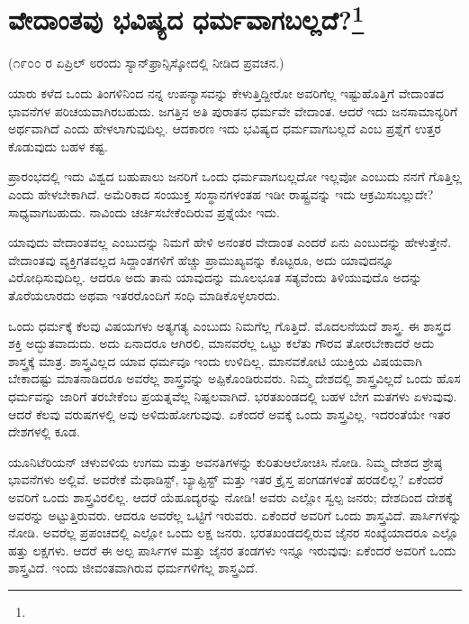 
\chapter[ವೇದಾಂತವು ಭವಿಷ್ಯದ ಧರ್ಮವಾಗಬಲ್ಲದೆ?]{ವೇದಾಂತವು ಭವಿಷ್ಯದ ಧರ್ಮವಾಗಬಲ್ಲದೆ?\protect\footnote{}}

\begin{center}
(೧೯೦೦ ರ ಏಪ್ರಿಲ್ ೮ರಂದು ಸ್ಯಾನ್‌ಫ್ರಾನ್ಸಿಸ್ಕೋದಲ್ಲಿ ನೀಡಿದ ಪ್ರವಚನ.)
\end{center}

ಯಾರು ಕಳೆದ ಒಂದು ತಿಂಗಳಿನಿಂದ ನನ್ನ ಉಪನ್ಯಾಸವನ್ನು ಕೇಳುತ್ತಿದ್ದೀರೋ ಅವರಿಗೆಲ್ಲ ಇಷ್ಟುಹೊತ್ತಿಗೆ ವೇದಾಂತದ ಭಾವನೆಗಳ ಪರಿಚಯವಾಗಿರಬಹುದು. ಜಗತ್ತಿನ ಅತಿ ಪುರಾತನ ಧರ್ಮವೇ ವೇದಾಂತ. ಆದರೆ ಇದು ಜನಸಾಮಾನ್ಯರಿಗೆ ಅರ್ಥವಾಗಿದೆ ಎಂದು ಹೇಳಲಾಗುವುದಿಲ್ಲ. ಆದಕಾರಣ ಇದು ಭವಿಷ್ಯದ ಧರ್ಮವಾಗಬಲ್ಲದೆ ಎಂಬ ಪ್ರಶ್ನೆಗೆ ಉತ್ತರ ಕೊಡುವುದು ಬಹಳ ಕಷ್ಟ.

ಪ್ರಾರಂಭದಲ್ಲಿ ಇದು ವಿಶ್ವದ ಬಹುಪಾಲು ಜನರಿಗೆ ಒಂದು ಧರ್ಮವಾಗಬಲ್ಲದೋ ಇಲ್ಲವೋ ಎಂಬುದು ನನಗೆ ಗೊತ್ತಿಲ್ಲ ಎಂದು ಹೇಳಬೇಕಾಗಿದೆ. ಅಮೆರಿಕಾದ ಸಂಯುಕ್ತ ಸಂಸ್ಥಾನಗಳಂತಹ ಇಡೀ ರಾಷ್ಟ್ರವನ್ನು ಇದು ಆಕ್ರಮಿಸಬಲ್ಲುದೇ? ಸಾಧ್ಯವಾಗಬಹುದು. ನಾವಿಂದು ಚರ್ಚಿಸಬೇಕೆಂದಿರುವ ಪ್ರಶ್ನೆಯೇ ಇದು.

ಯಾವುದು ವೇದಾಂತವಲ್ಲ ಎಂಬುದನ್ನು ನಿಮಗೆ ಹೇಳಿ ಅನಂತರ ವೇದಾಂತ ಎಂದರೆ ಏನು ಎಂಬುದನ್ನು ಹೇಳುತ್ತೇನೆ. ವೇದಾಂತವು ವ್ಯಕ್ತಿಗತವಲ್ಲದ ಸಿದ್ದಾಂತಗಳಿಗೆ ಹೆಚ್ಚು ಪ್ರಾಮುಖ್ಯವನ್ನು ಕೊಟ್ಟರೂ, ಅದು ಯಾವುದನ್ನೂ ವಿರೋಧಿಸುವುದಿಲ್ಲ. ಆದರೂ ಅದು ತಾನು ಯಾವುದನ್ನು ಮೂಲಭೂತ ಸತ್ಯವೆಂದು ತಿಳಿಯುವುದೊ ಅದನ್ನು ತೊರೆಯಲಾರದು ಅಥವಾ ಇತರರೊಂದಿಗೆ ಸಂಧಿ ಮಾಡಿಕೊಳ್ಳಲಾರದು.

ಒಂದು ಧರ್ಮಕ್ಕೆ ಕೆಲವು ವಿಷಯಗಳು ಅತ್ಯಗತ್ಯ ಎಂಬುದು ನಿಮಗೆಲ್ಲ ಗೊತ್ತಿದೆ. ಮೊದಲನೆಯದೆ ಶಾಸ್ತ್ರ. ಈ ಶಾಸ್ತ್ರದ ಶಕ್ತಿ ಅದ್ಭುತವಾದುದು. ಅದು ಏನಾದರೂ ಆಗಿರಲಿ, ಮಾನವರೆಲ್ಲ ಒಟ್ಟು ಕಲೆತು ಗೌರವ ತೋರಬೇಕಾದರೆ ಅದು ಶಾಸ್ತ್ರಕ್ಕೆ ಮಾತ್ರ. ಶಾಸ್ತ್ರವಿಲ್ಲದ ಯಾವ ಧರ್ಮವೂ ಇಂದು ಉಳಿದಿಲ್ಲ. ಮಾನವಕೋಟಿ ಯುಕ್ತಿಯ ವಿಷಯವಾಗಿ ಬೇಕಾದಷ್ಟು ಮಾತನಾಡಿದರೂ ಅವರೆಲ್ಲ ಶಾಸ್ತ್ರವನ್ನು ಅಪ್ಪಿಕೊಂಡಿರುವರು. ನಿಮ್ಮ ದೇಶದಲ್ಲಿ ಶಾಸ್ತ್ರವಿಲ್ಲದೆ ಒಂದು ಹೊಸ ಧರ್ಮವನ್ನು ಜಾರಿಗೆ ತರಬೇಕೆಂಬ ಪ್ರಯತ್ನವೆಲ್ಲ ನಿಷ್ಪಲವಾಗಿದೆ. ಭರತಖಂಡದಲ್ಲಿ ಬಹಳ ಬೇಗ ಮತಗಳು ಏಳುವುವು. ಆದರೆ ಕೆಲವು ವರುಷಗಳಲ್ಲಿ ಅವು ಅಳಿದುಹೋಗುವುವು. ಏಕೆಂದರೆ ಅವಕ್ಕೆ ಒಂದು ಶಾಸ್ತ್ರವಿಲ್ಲ. ಇದರಂತೆಯೇ ಇತರ ದೇಶಗಳಲ್ಲಿ ಕೂಡ.

ಯೂನಿಟೆರಿಯನ್ ಚಳುವಳಿಯ ಉಗಮ ಮತ್ತು ಅವನತಿಗಳನ್ನು ಕುರಿತು\break ಆಲೋಚಿಸಿ ನೋಡಿ. ನಿಮ್ಮ ದೇಶದ ಶ್ರೇಷ್ಠ ಭಾವನೆಗಳು ಅಲ್ಲಿವೆ. ಅವರೇಕೆ ಮೆಥಾಡಿಸ್ಟ್, ಬ್ಯಾಪ್ಟಿಸ್ಟ್ ಮತ್ತು ಇತರ ಕ್ರೈಸ್ತ ಪಂಗಡಗಳಂತೆ ಹರಡಲಿಲ್ಲ? ಏಕೆಂದರೆ ಅವರಿಗೆ ಒಂದು ಶಾಸ್ತ್ರವಿರಲಿಲ್ಲ. ಆದರೆ ಯೆಹೂದ್ಯರನ್ನು ನೋಡಿ! ಅವರು ಎಲ್ಲೋ ಸ್ವಲ್ಪ ಜನರು; ದೇಶದಿಂದ ದೇಶಕ್ಕೆ ಅವರನ್ನು ಅಟ್ಟುತ್ತಿರುವರು. ಆದರೂ ಅವರೆಲ್ಲ ಒಟ್ಟಿಗೆ ಇರುವರು. ಏಕೆಂದರೆ ಅವರಿಗೆ ಒಂದು ಶಾಸ್ತ್ರವಿದೆ. ಪಾರ್ಸಿಗಳನ್ನು ನೋಡಿ. ಅವರೆಲ್ಲ ಪ್ರಪಂಚದಲ್ಲಿ ಎಲ್ಲೋ ಒಂದು ಲಕ್ಷ ಜನರು. ಭರತಖಂಡದಲ್ಲಿರುವ ಜೈನರ ಸಂಖ್ಯೆಯಾದರೂ ಎಲ್ಲೊ ಹತ್ತು ಲಕ್ಷಗಳು. ಆದರೆ ಈ ಅಲ್ಪ ಪಾರ್ಸಿಗಳ ಮತ್ತು ಜೈನರ ತಂಡಗಳು ಇನ್ನೂ ಇರುವುವು: ಏಕೆಂದರೆ ಅವರಿಗೆ ಒಂದು ಶಾಸ್ತ್ರವಿದೆ. ಇಂದು ಜೀವಂತವಾಗಿರುವ ಧರ್ಮಗಳಿಗೆಲ್ಲ ಶಾಸ್ತ್ರವಿದೆ.

